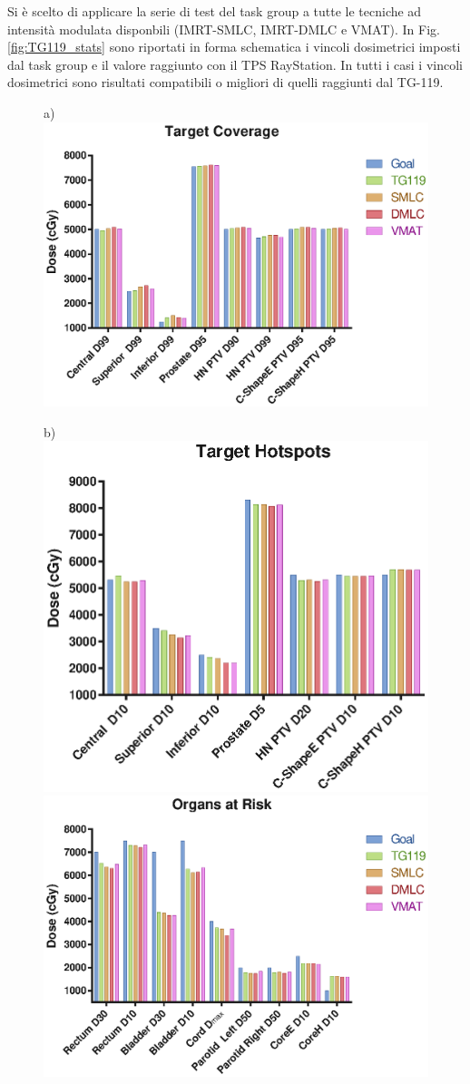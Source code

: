 Si è scelto di applicare la serie di test del task group a tutte le tecniche ad intensità modulata disponbili (IMRT-SMLC, IMRT-DMLC e VMAT). In Fig.\ref{fig:TG119_stats} sono riportati in forma schematica i vincoli dosimetrici imposti dal task group e il valore raggiunto con il TPS RayStation. In tutti i casi i vincoli dosimetrici sono risultati compatibili o migliori di quelli raggiunti dal TG-119.
\begin{figure}
\centering
a)\includegraphics[width=.7\textwidth]{./cap2/TG119_Plots/Target_Coverage.eps}\\
\centerline{
b)\includegraphics[width=.55\textwidth]{./cap2/TG119_Plots/Target_Hotspots.eps}
\includegraphics[width=.7\textwidth]{./cap2/TG119_Plots/OARs.eps}}

\end{figure}
